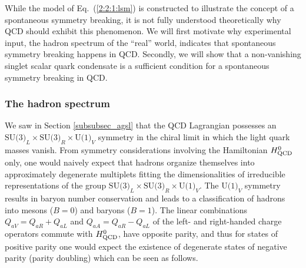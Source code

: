 \documentclass[twoside,12pt]{article}
\begin{document}
   While the model of Eq.~(\ref{2:2:1:lsm}) is constructed to illustrate the concept
of a spontaneous symmetry breaking, it is not fully understood
theoretically why QCD should exhibit this phenomenon.
   We will first motivate why experimental input, the hadron spectrum
of the ``real'' world, indicates that spontaneous symmetry breaking
happens in QCD.
   Secondly, we will show that a non-vanishing singlet scalar quark
condensate is a sufficient condition for a spontaneous symmetry breaking in
QCD.

\subsubsection{The hadron spectrum}
\label{subsec_hs}
   We saw in Section \ref{subsubsec_agsl} that the QCD Lagrangian possesses
an $\mbox{SU(3)}_L\times\mbox{SU(3)}_R\times \mbox{U(1)}_V$
symmetry in the chiral limit in which the light quark masses
vanish.
   From symmetry considerations involving the Hamiltonian $H^0_{\rm QCD}$
only, one would naively expect that hadrons organize themselves into
approximately degenerate multiplets fitting the dimensionalities
of irreducible representations of the group
$\mbox{SU(3)}_L\times\mbox{SU(3)}_R\times\mbox{U(1)}_V$.
   The $\mbox{U(1)}_V$ symmetry results in
baryon number conservation and leads to a classification of
hadrons into mesons ($B=0$) and baryons ($B=1$).
   The linear combinations $Q_{aV}=Q_{aR}+Q_{aL}$ and $Q_{aA}=Q_{aR}-Q_{aL}$
of the left- and right-handed charge operators commute with
$H^0_{\rm QCD}$, have opposite parity, and thus for states of positive
parity one would expect the existence of degenerate states of negative
parity (parity doubling) which can be seen as follows.
\end{document}
